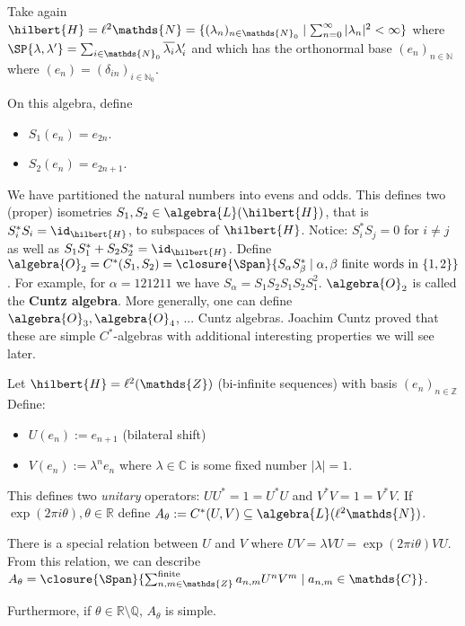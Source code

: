 \documentclass[a4paper]{article}
\begin{document}
\begin{example}
	Take again $\hilbert{H} = \ell^2\mathds{N} = \{(\lambda_n)_{n \in \mathds{N}_0} \mid \sum_{n = 0}^{\infty} |\lambda_n|^2 < \infty\}$ where $\SP{\lambda, \lambda'} = \sum_{i \in \mathds{N}_0} \overline{\lambda_i} \lambda_i'$ and which has the orthonormal base $(e_n)_{n \in \mathds{N}}$ where $(e_n) = (\delta_{in})_{i \in \mathds{N}_0}$.

	On this algebra, define
	\begin{itemize}
		\item $S_1(e_n) = e_{2n}$.
		\item $S_2(e_n) = e_{2n + 1}$.
	\end{itemize}
	We have partitioned the natural numbers into evens and odds. This defines two (proper) isometries $S_1, S_2 \in \algebra{L}(\hilbert{H})$, that is $S_i^* S_i = \id_\hilbert{H}$, to subspaces of $\hilbert{H}$. Notice: $S_i^*S_j = 0$  for $i \neq j$ as well as $S_1 S_1^* + S_2S_2^* = \id_\hilbert{H}$.  Define $\algebra{O}_2 = C^*(S_1, S_2) = \closure{\Span}\{S_\alpha S_\beta^* \mid \alpha, \beta \text{ finite words in } \{1,2\}\}$. For example, for $\alpha = 121211$ we have $S_{\alpha} = S_1 S_2 S_1 S_2 S_1^2$. $\algebra{O}_2$ is called the \textbf{Cuntz algebra}. More generally, one can define $\algebra{O}_3, \algebra{O}_4$, ... Cuntz algebras. Joachim Cuntz proved that these are simple $C^*$-algebras with additional interesting properties we will see later.
\end{example}

\begin{example}
	Let $\hilbert{H} = \ell^2(\mathds{Z})$ (bi-infinite sequences) with basis $(e_n)_{n \in \mathds{Z}}$  Define:
	\begin{itemize}
		\item $U(e_n) := e_{n+1}$ (bilateral shift)
		\item $V(e_n) := \lambda^n e_n$ where $\lambda\in\mathds{C}$ is some fixed number $|\lambda| = 1$.
	\end{itemize}
	This defines two \textit{unitary} operators: $U U^* = 1 = U^* U$ and $V^* V = 1 = V^*V$. If $\exp(2 \pi i \theta), \theta \in \mathds{R}$ define $A_\theta := C^*(U,V) \subseteq \algebra{L}(\ell^2 \mathds{N})$.

	There is a special relation between $U$ and $V$ where $UV = \lambda VU = \exp(2 \pi i \theta) V U$. From this relation, we can describe $A_\theta = \closure{\Span}\{\sum_{n,m \in \mathds{Z}}^{\text{finite}} a_{n,m} U^n V^m \mid a_{n,m} \in \mathds{C}\}$.

	Furthermore, if $\theta \in \mathds{R} \setminus \mathds{Q}$, $A_\theta$ is simple.
\end{example}
\end{document}
